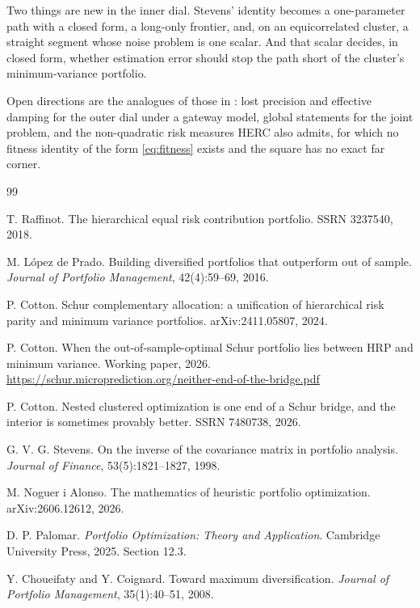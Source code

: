 \documentclass[11pt]{article}
\begin{document}
Two things are new in the inner dial. Stevens' identity becomes a
one-parameter path with a closed form, a long-only frontier, and, on an
equicorrelated cluster, a straight segment whose noise problem is one
scalar. And that scalar decides, in closed form, whether estimation error
should stop the path short of the cluster's minimum-variance portfolio.

Open directions are the analogues of those in \cite{cotton2026nco}: lost
precision and effective damping for the outer dial under a gateway model,
global statements for the joint problem, and the non-quadratic risk
measures HERC also admits, for which no fitness identity of the form
\eqref{eq:fitness} exists and the square has no exact far corner.

\begin{thebibliography}{99}

T. Raffinot.
The hierarchical equal risk contribution portfolio.
SSRN 3237540, 2018.

M. L\'opez de Prado.
Building diversified portfolios that outperform out of sample.
\emph{Journal of Portfolio Management}, 42(4):59--69, 2016.

P. Cotton.
Schur complementary allocation: a unification of hierarchical risk parity
and minimum variance portfolios.
arXiv:2411.05807, 2024.

P. Cotton.
When the out-of-sample-optimal Schur portfolio lies between HRP and
minimum variance.
Working paper, 2026.
\url{https://schur.microprediction.org/neither-end-of-the-bridge.pdf}

P. Cotton.
Nested clustered optimization is one end of a Schur bridge, and the
interior is sometimes provably better.
SSRN 7480738, 2026.

G. V. G. Stevens.
On the inverse of the covariance matrix in portfolio analysis.
\emph{Journal of Finance}, 53(5):1821--1827, 1998.

M. Noguer i Alonso.
The mathematics of heuristic portfolio optimization.
arXiv:2606.12612, 2026.

D. P. Palomar.
\emph{Portfolio Optimization: Theory and Application}.
Cambridge University Press, 2025. Section 12.3.

Y. Choueifaty and Y. Coignard.
Toward maximum diversification.
\emph{Journal of Portfolio Management}, 35(1):40--51, 2008.


\end{thebibliography}
\end{document}
